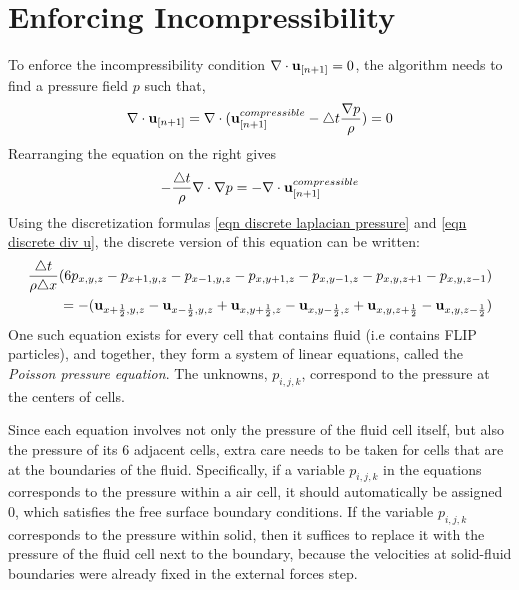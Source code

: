 \section{Enforcing Incompressibility}
\label{section enforce incompressibility}
To enforce the incompressibility condition $\nabla \cdot \textbf{u}_{[n+1]} = 0$, the algorithm needs to find a pressure field $p$ such that,
\begin{equation*}
    \begin{aligned}
        \nabla \cdot \textbf{u}_{[n+1]} = \nabla \cdot
        ( \textbf{u}_{[n+1]}^{compressible} - \triangle t \frac{\nabla p}{\rho} ) = 0
    \end{aligned}
\end{equation*}
Rearranging the equation on the right gives
\begin{equation}
-\frac{\triangle t}{\rho} \nabla \cdot \nabla p = -\nabla \cdot \textbf{u}_{[n+1]}^{compressible}
\label{eqn pressure poisson continuous}
\end{equation}
Using the discretization formulas \ref{eqn discrete laplacian pressure} and \ref{eqn discrete div u}, the discrete version of this equation can be written: 
\begin{equation}
    \begin{aligned}
        \frac{\triangle t}{\rho \triangle x}(6p_{x,y,z}-p_{x+1,y,z}-p_{x-1,y,z}-p_{x,y+1,z}-p_{x,y-1,z}-p_{x,y,z+1}-p_{x,y,z-1}) \\
        = 
        -( \textbf{u}_{x+\frac{1}{2},y,z} - \textbf{u}_{x-\frac{1}{2},y,z}  +  
         \textbf{u}_{x,y+\frac{1}{2},z} - \textbf{u}_{x,y-\frac{1}{2},z} +
         \textbf{u}_{x,y,z+\frac{1}{2}} - \textbf{u}_{x,y,z-\frac{1}{2}})
    \end{aligned}
    \label{eqn poisson pressure}
\end{equation}
One such equation exists for every cell that contains fluid (i.e contains FLIP particles), and together, they form a system of linear equations, called the \textit{Poisson pressure equation}. The unknowns, $p_{i,j,k}$, correspond to the pressure at the centers of cells.

Since each equation involves not only the pressure of the fluid cell itself, but also the pressure of its 6 adjacent cells, extra care needs to be taken for cells that are at the boundaries of the fluid. Specifically, if a variable $p_{i,j,k}$ in the equations corresponds to the pressure within a air cell, it should automatically be assigned 0, which satisfies the free surface boundary conditions. If the variable $p_{i,j,k}$ corresponds to the pressure within solid, then it suffices to replace it with the pressure of the fluid cell next to the boundary, because the velocities at solid-fluid boundaries were already fixed in the external forces step.

